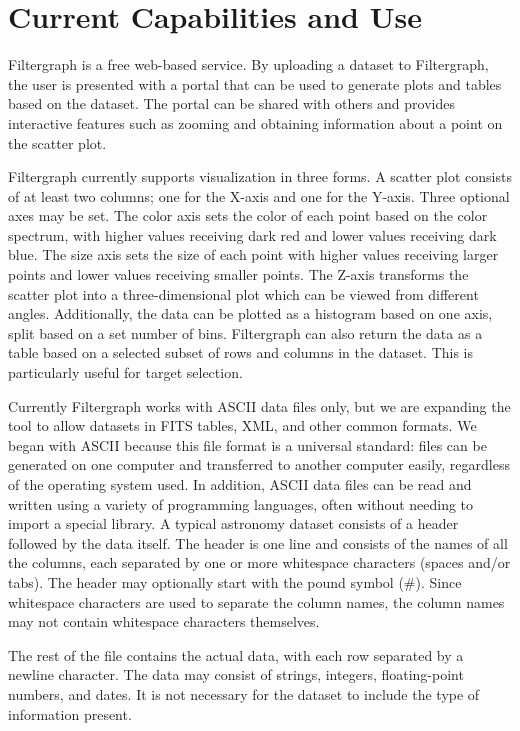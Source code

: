 \section{Current Capabilities and Use}
Filtergraph is a free web-based service. By uploading a dataset to Filtergraph, the user is presented with a portal that can be used to generate plots and tables based on the dataset. The portal can be shared with others and provides interactive features such as zooming and obtaining information about a point on the scatter plot.

Filtergraph currently supports visualization in three forms. A scatter plot consists of at least two columns; one for the X-axis and one for the Y-axis. Three optional axes may be set. The color axis sets the color of each point based on the color spectrum, with higher values receiving dark red and lower values receiving dark blue. The size axis sets the size of each point with higher values receiving larger points and lower values receiving smaller points. The Z-axis transforms the scatter plot into a three-dimensional plot which can be viewed from different angles. Additionally, the data can be plotted as a histogram based on one axis, split based on a set number of bins. Filtergraph can also return the data as a table based on a selected subset of rows and columns in the dataset. This is particularly useful for target selection.

Currently Filtergraph works with ASCII data files only, but we are expanding the tool to allow datasets in FITS tables, XML, and other common formats. We began with ASCII because this file format is a universal standard: files can be generated on one computer and transferred to another computer easily, regardless of the operating system used. In addition, ASCII data files can be read and written using a variety of programming languages, often without needing to import a special library. A typical astronomy dataset consists of a header followed by the data itself. The header is one line and consists of the names of all the columns, each separated by one or more whitespace characters (spaces and/or tabs). The header may optionally start with the pound symbol (\#). Since whitespace characters are used to separate the column names, the column names may not contain whitespace characters themselves.

The rest of the file contains the actual data, with each row separated by a newline character. The data may consist of strings, integers, floating-point numbers, and dates. It is not necessary for the dataset to include the type of information present.

